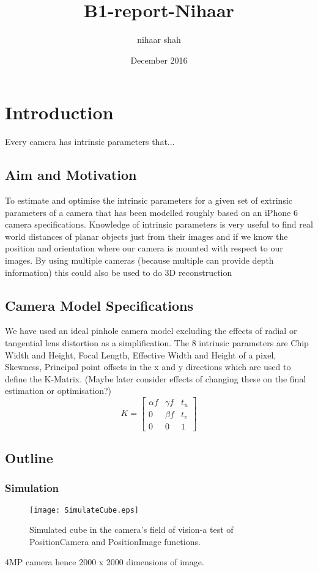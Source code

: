 \documentclass[titlepage]{article}
\title{B1-report-Nihaar}
\author{nihaar shah }
\date{December 2016}
\begin{document}
\maketitle
%
\section{Introduction}
Every camera has intrinsic parameters that...
\subsection{Aim and Motivation}
To estimate and optimise the intrinsic parameters for a given set of extrinsic parameters of a camera that has been modelled roughly based on an iPhone 6 camera specifications.
%
Knowledge of intrinsic parameters is very useful to find real world distances of planar objects just from their images and if we know the position and orientation where our camera is mounted with respect to our images. By using multiple cameras (because multiple can provide depth information) this could also be used to do 3D reconstruction
%
\subsection{Camera Model Specifications}
We have used an ideal pinhole camera model excluding the effects of radial or tangential lens distortion as a simplification. The 8 intrinsic parameters are Chip Width and Height, Focal Length, Effective Width and Height of a pixel, Skewness, Principal point offsets in the x and y directions which are used to define the K-Matrix.
(Maybe later consider effects of changing these on the final estimation or optimisation?)
%
\begin{equation} \label{KMatrix}
K=
  \begin{bmatrix}
  \alpha f & \gamma f & t_u \\ 
  0        & \beta f  & t_v \\ 
  0        &    0     &  1 
  \end{bmatrix}
\end{equation}
%
\subsection{Outline}
\subsubsection{Simulation}
%
\begin{figure}
\caption{Simulated cube in the camera's field of vision-a test of PositionCamera and PositionImage functions.}\label{wrap-fig:9}
\texttt{[image: SimulateCube.eps]}
\end{figure}
4MP camera hence 2000 x 2000 dimensions of image.
%
\end{document}
